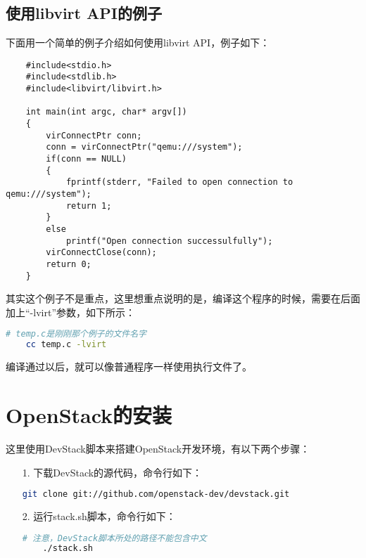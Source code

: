 \documentclass[a4paper,left=2.5cm,right=2.5cm,11pt]{article}
\begin{document}
\subsection{使用libvirt API的例子}
	下面用一个简单的例子介绍如何使用libvirt API，例子如下：
	\begin{lstlisting}
	#include<stdio.h>
	#include<stdlib.h>
	#include<libvirt/libvirt.h>

	int main(int argc, char* argv[])
	{
		virConnectPtr conn;
		conn = virConnectPtr("qemu:///system");
		if(conn == NULL)
		{
			fprintf(stderr, "Failed to open connection to qemu:///system");
			return 1;
		}
		else
			printf("Open connection successulfully");
		virConnectClose(conn);
		return 0;
	}
	\end{lstlisting}

	其实这个例子不是重点，这里想重点说明的是，编译这个程序的时候，需要在后面加上“-lvirt”参数，如下所示：
	\begin{lstlisting}[language = bash]
	# temp.c是刚刚那个例子的文件名字
	cc temp.c -lvirt
	\end{lstlisting}

	编译通过以后，就可以像普通程序一样使用执行文件了。

\clearpage

\section{OpenStack的安装}
	这里使用DevStack脚本来搭建OpenStack开发环境，有以下两个步骤：
	\begin{itemize}
		\item[1.] 下载DevStack的源代码，命令行如下：
		\begin{lstlisting}[language = bash]
	git clone git://github.com/openstack-dev/devstack.git
		\end{lstlisting}

		\item[2.] 运行stack.sh脚本，命令行如下：
		\begin{lstlisting}[language = bash]
	# 注意，DevStack脚本所处的路径不能包含中文
	./stack.sh
		\end{lstlisting}
	\end{itemize}
\end{document}

